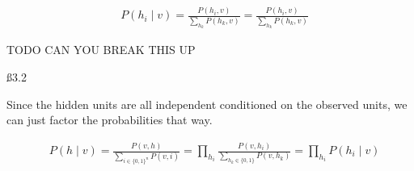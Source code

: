 \begin{align*}
& P (h_i \mid v) = \frac {P (h_i, v)}{\sum_{h_k} P(h_k, v)} = \frac {P (h_i, v)}{\sum_{h_k} P(h_k, v)}
\end{align*}

TODO CAN YOU BREAK THIS UP

\ss{3.2}

Since the hidden units are all independent conditioned on the observed units, we can just factor the probabilities that way.

\begin{align*}
& P(h \mid v) = \frac{P(v,h)}{\sum_{i \in \{0,1\}^n} P(v,i)} = \prod_{h_i} \frac{P(v,h_i)}{\sum_{h_k \in \{0,1\}} P(v,h_k)} = \prod_{h_i} P(h_i \mid v)
\end{align*}


